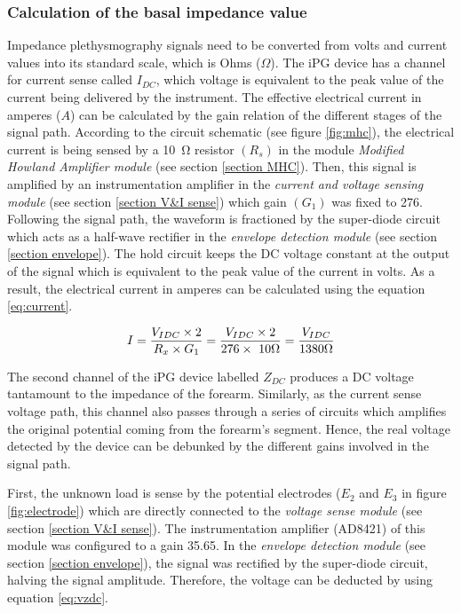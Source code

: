 \subsubsection{Calculation of the basal impedance value}
Impedance plethysmography signals need to be converted from volts and current values into its standard scale, which is Ohms ($\Omega$). The iPG device has a channel for current sense called $I_{DC}$, which voltage is equivalent to the peak value of the current being delivered by the instrument. The effective electrical current in amperes ($A$) can be calculated by the gain relation of the different stages of the signal path. According to the circuit schematic (see figure \ref{fig:mhc}), the electrical current is being sensed by a \SI{10}{\ohm} resistor $(R_s)$ in the module \textit{Modified Howland Amplifier module} (see section \ref{section MHC}). Then, this signal is amplified by an instrumentation amplifier in the \textit{current and voltage sensing module} (see section \ref{section V&I sense}) which gain $(G_1)$ was fixed to \num{276}. Following the signal path, the waveform is fractioned by the super-diode circuit which acts as a half-wave rectifier in the \textit{envelope detection module} (see section \ref{section envelope}). The hold circuit keeps the DC voltage constant at the output of the signal which is equivalent to the peak value of the current in volts. As a result, the electrical current in amperes can be calculated using the equation \ref{eq:current}.

\begin{align}
	\label{eq:current}
	I = \frac{V_{IDC} \times 2}{R_x \times G_1} = \frac{V_{IDC} \times 2}{276 \times\ 10 \Omega} = \frac{V_{IDC}}{1380 \Omega} \tagaddtext{[\si{\ampere}]}
\end{align}


The second channel of the iPG device labelled $Z_{DC}$ produces a DC voltage tantamount to the impedance of the forearm. Similarly, as the current sense voltage path, this channel also passes through a series of circuits which amplifies the original potential coming from the forearm's segment. Hence, the real voltage detected by the device can be debunked by the different gains involved in the signal path. 

First, the unknown load is sense by the potential electrodes ($E_2$ and $E_3$ in figure \ref{fig:electrode}) which are directly connected to the \textit{voltage sense module} (see section \ref{section V&I sense}). The instrumentation amplifier (AD8421) of this module was configured to a gain \num{35.65}. In the \textit{envelope detection module} (see section \ref{section envelope}), the signal was rectified by the super-diode circuit, halving the signal amplitude. Therefore, the voltage can be deducted by using equation \ref{eq:vzdc}.

